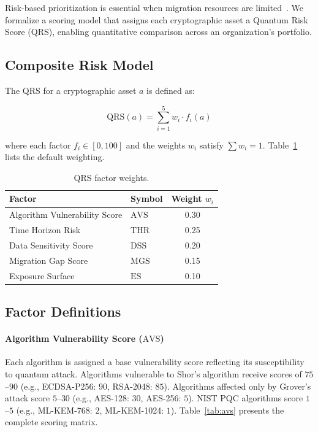 \documentclass[conference,10pt]{IEEEtran}
\newcommand{\qrs}{\textrm{QRS}}
\newcommand{\avs}{\textrm{AVS}}
\newcommand{\thr}{\textrm{THR}}
\newcommand{\dss}{\textrm{DSS}}
\newcommand{\mgs}{\textrm{MGS}}
\newcommand{\es}{\textrm{ES}}
\begin{document}
Risk-based prioritization is essential when migration resources are
limited~\cite{joseph2022}. We formalize a scoring model that assigns
each cryptographic asset a Quantum Risk Score (QRS), enabling
quantitative comparison across an organization's portfolio.

\subsection{Composite Risk Model}

The QRS for a cryptographic asset $a$ is defined as:

\begin{equation}\label{eq:qrs}
  \qrs(a) = \sum_{i=1}^{5} w_i \cdot f_i(a)
\end{equation}

\noindent where each factor $f_i \in [0, 100]$ and the weights $w_i$
satisfy $\sum w_i = 1$. Table~\ref{tab:weights} lists the default
weighting.

\begin{table}[t]
\centering
\caption{QRS factor weights.}
\label{tab:weights}
\footnotesize
\begin{tabular}{@{}llc@{}}
\toprule
\textbf{Factor} & \textbf{Symbol} & \textbf{Weight $w_i$} \\
\midrule
Algorithm Vulnerability Score & $\avs$ & 0.30 \\
Time Horizon Risk             & $\thr$ & 0.25 \\
Data Sensitivity Score        & $\dss$ & 0.20 \\
Migration Gap Score           & $\mgs$ & 0.15 \\
Exposure Surface              & $\es$  & 0.10 \\
\bottomrule
\end{tabular}
\end{table}

\subsection{Factor Definitions}

\paragraph{Algorithm Vulnerability Score ($\avs$)}
Each algorithm is assigned a base vulnerability score reflecting its
susceptibility to quantum attack. Algorithms vulnerable to Shor's
algorithm receive scores of $75$--$90$ (e.g., ECDSA-P256: $90$,
RSA-2048: $85$). Algorithms affected only by Grover's attack score
$5$--$30$ (e.g., AES-128: $30$, AES-256: $5$). NIST PQC algorithms
score $1$--$5$ (e.g., ML-KEM-768: $2$, ML-KEM-1024: $1$).
Table~\ref{tab:avs} presents the complete scoring matrix.
\end{document}

